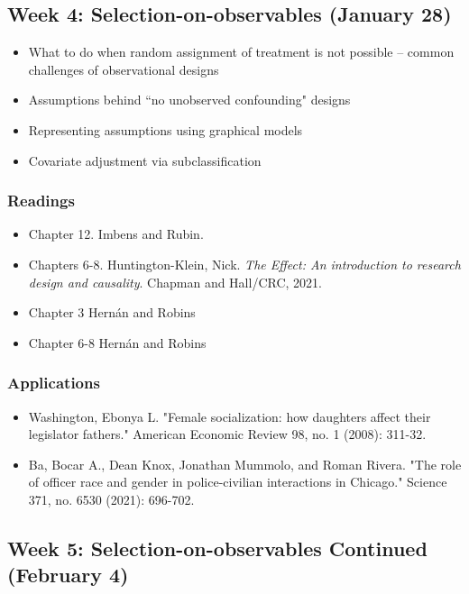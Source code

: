 \documentclass[11pt, article, oneside]{memoir}
\theoremstyle{Assumption}
\begin{document}
\subsection{Week 4: Selection-on-observables (January 28)}

\begin{itemize}
\item What to do when random assignment of treatment is not possible -- common challenges of observational designs
\item Assumptions behind ``no unobserved confounding" designs
\item Representing assumptions using graphical models
\item Covariate adjustment via subclassification
\end{itemize}

\subsubsection*{Readings}

\begin{itemize}
\item Chapter 12. Imbens and Rubin.
\item Chapters 6-8. Huntington-Klein, Nick. \emph{The Effect: An introduction to research design and causality}. Chapman and Hall/CRC, 2021.
\item Chapter 3 Hern\'an and  Robins
\item Chapter 6-8 Hern\'an and  Robins
\end{itemize}

\subsubsection*{Applications}

\begin{itemize}
\item Washington, Ebonya L. "Female socialization: how daughters affect their legislator fathers." American Economic Review 98, no. 1 (2008): 311-32.
\item Ba, Bocar A., Dean Knox, Jonathan Mummolo, and Roman Rivera. "The role of officer race and gender in police-civilian interactions in Chicago." Science 371, no. 6530 (2021): 696-702.
\end{itemize}

\subsection{Week 5: Selection-on-observables Continued (February 4)}
\end{document}
